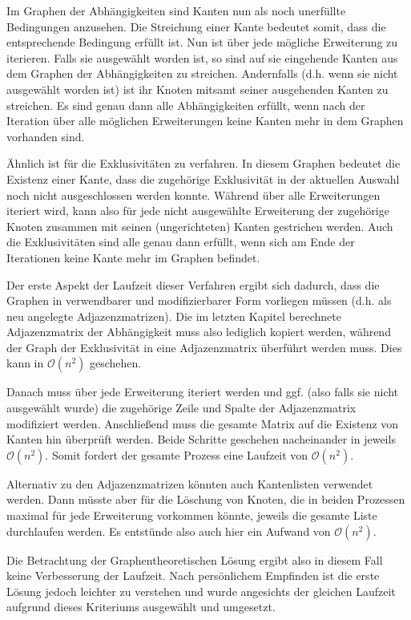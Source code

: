Im Graphen der Abhängigkeiten sind Kanten nun als noch unerfüllte Bedingungen anzusehen. Die Streichung einer Kante bedeutet somit, dass die entsprechende Bedingung erfüllt ist. Nun ist über jede mögliche Erweiterung zu iterieren. Falls sie ausgewählt worden ist, so sind auf sie eingehende Kanten aus dem Graphen der Abhängigkeiten zu streichen. Andernfalls (d.h. wenn sie nicht ausgewählt worden ist) ist ihr Knoten mitsamt seiner ausgehenden Kanten zu streichen. Es sind genau dann alle Abhängigkeiten erfüllt, wenn nach der Iteration über alle möglichen Erweiterungen keine Kanten mehr in dem Graphen vorhanden sind.

Ähnlich ist für die Exklusivitäten zu verfahren. In diesem Graphen bedeutet die Existenz einer Kante, dass die zugehörige Exklusivität in der aktuellen Auswahl noch nicht ausgeschlossen werden konnte. Während über alle Erweiterungen iteriert wird, kann also für jede nicht ausgewählte Erweiterung der zugehörige Knoten zusammen mit seinen (ungerichteten) Kanten gestrichen werden. Auch die Exklusivitäten sind alle genau dann erfüllt, wenn sich am Ende der Iterationen keine Kante mehr im Graphen befindet.

Der erste Aspekt der Laufzeit dieser Verfahren ergibt sich dadurch, dass die Graphen in verwendbarer und modifizierbarer Form vorliegen müssen (d.h. als neu angelegte Adjazenzmatrizen). Die im letzten Kapitel berechnete Adjazenzmatrix der Abhängigkeit muss also lediglich kopiert werden, während der Graph der Exklusivität in eine Adjazenzmatrix überführt werden muss. Dies kann in $\mathcal{O}(n^2)$ geschehen.

Danach muss über jede Erweiterung iteriert werden und ggf. (also falls sie nicht ausgewählt wurde) die zugehörige Zeile und Spalte der Adjazenzmatrix modifiziert werden. Anschließend muss die gesamte Matrix auf die Existenz von Kanten hin überprüft werden. Beide Schritte geschehen nacheinander in jeweils $\mathcal{O}(n^2)$. Somit fordert der gesamte Prozess eine Laufzeit von $\mathcal{O}(n^2)$.

Alternativ zu den Adjazenzmatrizen könnten auch Kantenlisten verwendet werden. Dann müsste aber für die Löschung von Knoten, die in beiden Prozessen maximal für jede Erweiterung vorkommen könnte, jeweils die gesamte Liste durchlaufen werden. Es entstünde also auch hier ein Aufwand von $\mathcal{O}(n^2)$.

Die Betrachtung der Graphentheoretischen Lösung ergibt also in diesem Fall keine Verbesserung der Laufzeit. Nach persönlichem Empfinden ist die erste Lösung jedoch leichter zu verstehen und wurde angesichts der gleichen Laufzeit aufgrund dieses Kriteriums ausgewählt und umgesetzt.

